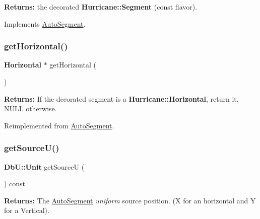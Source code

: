 {\bfseries Returns\+:} the decorated \textbf{ Hurricane\+::\+Segment} (const flavor). 

Implements \hyperlink{classKatabatic_1_1AutoSegment_a53877ff5ef48eb0030c2581a6eeb3c09}{Auto\+Segment}.

\mbox{\label{classKatabatic_1_1AutoHorizontal_a659b8ed90de679564924afe07af478de}} 
\subsubsection{\texorpdfstring{get\+Horizontal()}{getHorizontal()}}
{\footnotesize\ttfamily \textbf{ Horizontal} $\ast$ get\+Horizontal (\begin{DoxyParamCaption}{ }\end{DoxyParamCaption})\hspace{0.3cm}{\ttfamily [virtual]}}

{\bfseries Returns\+:} If the decorated segment is a \textbf{ Hurricane\+::\+Horizontal}, return it. {\ttfamily N\+U\+LL} otherwise. 

Reimplemented from \hyperlink{classKatabatic_1_1AutoSegment_a659b8ed90de679564924afe07af478de}{Auto\+Segment}.

\mbox{\label{classKatabatic_1_1AutoHorizontal_ad521ffba761b0e81b7b81b99d62f76f9}} 
\subsubsection{\texorpdfstring{get\+Source\+U()}{getSourceU()}}
{\footnotesize\ttfamily \textbf{ Db\+U\+::\+Unit} get\+SourceU (\begin{DoxyParamCaption}{ }\end{DoxyParamCaption}) const\hspace{0.3cm}{\ttfamily [virtual]}}

{\bfseries Returns\+:} The \hyperlink{classKatabatic_1_1AutoSegment}{Auto\+Segment} {\itshape uniform} source position. (X for an horizontal and Y for a Vertical). 

